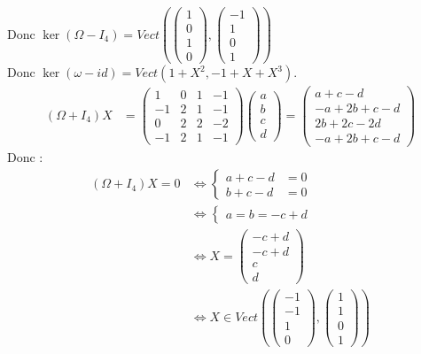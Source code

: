 \documentclass[../main.tex]{subfiles}
\begin{document}
Donc $\ker(\Omega - I_4) = Vect\left(\begin{pmatrix}
    1 \\
    0 \\
    1 \\
    0
\end{pmatrix}, \begin{pmatrix}
    -1 \\
    1 \\
    0 \\
    1
\end{pmatrix}\right)$ \\
Donc $\ker(\omega - id) = Vect(1 + X^2, -1 + X + X^3)$. 
\begin{align*}
    (\Omega + I_4)X &= \begin{pmatrix}
        1 & 0 & 1 & -1 \\
        -1 & 2 & 1 & -1 \\
        0 & 2 & 2 & -2 \\
        -1 & 2 & 1 & -1
    \end{pmatrix} \begin{pmatrix}
        a \\
        b \\
        c \\
        d
    \end{pmatrix} = \begin{pmatrix}
        a + c - d \\
        -a + 2b + c - d \\
        2b + 2c - 2d \\
        -a + 2b + c - d
    \end{pmatrix}
\end{align*}
Donc : 
\begin{align*}
    (\Omega + I_4)X = 0 &\Leftrightarrow \begin{cases}
        a + c - d &= 0 \\
        b + c - d &= 0
    \end{cases} \\
    &\Leftrightarrow \begin{cases}
        a = b = -c + d
    \end{cases} \\
    &\Leftrightarrow X = \begin{pmatrix}
        -c + d \\
        -c + d \\
        c \\
        d
    \end{pmatrix} \\
    &\Leftrightarrow X\in Vect\left(\begin{pmatrix}
        -1 \\
        -1 \\
        1 \\
        0
    \end{pmatrix}, \begin{pmatrix}
        1 \\
        1 \\
        0 \\
        1
    \end{pmatrix}\right)
\end{align*}
\end{document}
